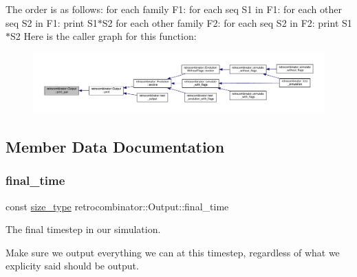 The order is as follows\+: for each family F1\+: for each seq S1 in F1\+: for each other seq S2 in F1\+: print S1$\ast$\+S2 for each other family F2\+: for each seq S2 in F2\+: print S1$\ast$\+S2 Here is the caller graph for this function\+:
\nopagebreak
\begin{figure}[H]
\begin{center}
\leavevmode
\includegraphics[width=350pt]{classretrocombinator_1_1Output_ac5632b57357788ba7d25769c412a2a11_icgraph}
\end{center}
\end{figure}


\subsection{Member Data Documentation}
\mbox{\label{classretrocombinator_1_1Output_a94f5e60b0aafcc409c78507c5e34ba7a}} 
\subsubsection{\texorpdfstring{final\+\_\+time}{final\_time}}
{\footnotesize\ttfamily const \hyperlink{namespaceretrocombinator_a8e1541b50cee66a791df4c437ccbb385}{size\+\_\+type} retrocombinator\+::\+Output\+::final\+\_\+time\hspace{0.3cm}{\ttfamily [private]}}



The final timestep in our simulation. 

Make sure we output everything we can at this timestep, regardless of what we explicity said should be output. \mbox{\label{classretrocombinator_1_1Output_a52a175aea7babe70c97021c0ccc47b4f}} 
